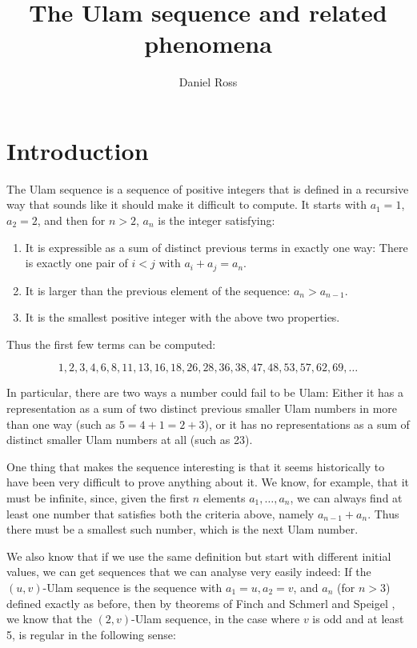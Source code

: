 \documentclass{article}
\title{The Ulam sequence and related phenomena}
\author{Daniel Ross}
\date{ }
\theoremstyle{definition}
\theoremstyle{remark}
\numberwithin{equation}{section}
\begin{document}
\maketitle

\tableofcontents

\section{Introduction}

The Ulam sequence is a sequence of positive integers that is defined
in a recursive way that sounds like it should make it difficult to
compute.  It starts with $a_1 = 1$, $a_2 = 2$, and then for $n > 2$,
$a_n$ is the integer satisfying: 
\begin{enumerate}
\item It is expressible as a sum of distinct previous terms in exactly
  one way: There is exactly one pair of $i < j$ with
  $a_i + a_j = a_n$.
\item It is larger than the previous element of the sequence: $a_n >
  a_{n-1}$.
\item It is the smallest positive integer with the above two
  properties.
\end{enumerate}

Thus the first few terms can be computed: 

\[1, 2, 3, 4, 6, 8, 11, 13, 16, 18, 26, 28, 36, 38, 47, 48, 53, 57, 62,
69, \ldots\]

In particular, there are two ways a number could fail to be Ulam:
Either it has a representation as a sum of two distinct previous
smaller Ulam numbers in more than one way (such as $5 = 4+1 = 2+3$),
or it has no representations as a sum of distinct smaller Ulam numbers
at all (such as 23).

One thing that makes the sequence interesting is that it seems
historically to have been very difficult to prove anything about it.
We know, for example, that it must be infinite, since, given the first
$n$ elements $a_1, \ldots, a_n$, we can always find at least one
number that satisfies both the criteria above, namely $a_{n-1} +
a_n$.  Thus there must be a smallest such number, which is the next
Ulam number.  

We also know that if we use the same definition but start with
different initial values, we can get sequences that we can analyse
very easily indeed: If the $(u,v)$-Ulam sequence is the sequence with
$a_1 = u, a_2 = v$, and $a_n$ (for $n > 3$) defined exactly as before,
then by theorems of Finch \cite{regularity_criterion_finch} and Schmerl and Speigel \cite{regularity_schmerl}, we
know that the $(2,v)$-Ulam sequence, in the case where $v$ is odd and
at least 5, is regular in the following sense:
\end{document}
